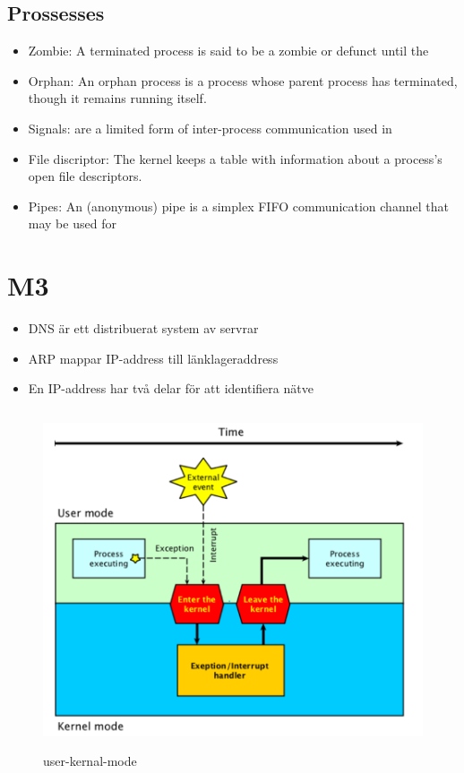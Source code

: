 \subsection{Prossesses}
\begin{itemize}
\item Zombie: A terminated process is said to be a zombie or defunct until the
\item Orphan: An orphan process is a process whose parent process has terminated, though it remains running itself.
\item Signals: are a limited form of inter-process communication used in
\item File discriptor: The kernel keeps a table with information about a process’s open file descriptors.
\item Pipes: An (anonymous) pipe is a simplex FIFO communication channel that may be used for
\end{itemize}

\section{M3}
\begin{itemize}
\item DNS är ett distribuerat system av servrar
\item ARP mappar IP-address till länklageraddress
\item En IP-address har två delar för att identifiera nätve
\end{itemize}

\begin{figure}[h]
    \vspace{10mm}
    \centering
    \includegraphics[width=14cm, height=10cm]{image/user-kernal-mode.png}
    \caption{user-kernal-mode}
\end{figure}

